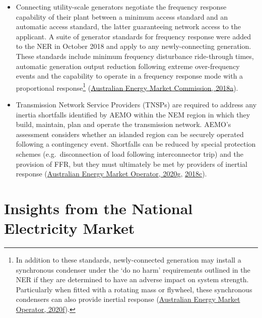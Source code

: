 \documentclass[12pt,a4paper,]{report}
\begin{document}
\begin{itemize}
\item
  Connecting utility-scale generators negotiate the frequency response
  capability of their plant between a minimum access standard and an
  automatic access standard, the latter guaranteeing network access to
  the applicant. A suite of generator standards for frequency response
  were added to the NER in October 2018 and apply to any
  newly-connecting generation. These standards include minimum frequency
  disturbance ride-through times, automatic generation output reduction
  following extreme over-frequency events and the capability to operate
  in a frequency response mode with a proportional response\footnote{In
    addition to these standards, newly-connected generation may install
    a synchronous condenser under the `do no harm' requirements outlined
    in the NER if they are determined to have an adverse impact on
    system strength. Particularly when fitted with a rotating mass or
    flywheel, these synchronous condensers can also provide inertial
    response
    (\protect\hyperlink{ref-australianenergymarketoperatorSystemStrengthNEM2020}{Australian
    Energy Market Operator, 2020f}).}
  (\protect\hyperlink{ref-australianenergymarketcommissionGeneratorTechnicalPerformance2018}{Australian
  Energy Market Commission, 2018a}).
\item
  Transmission Network Service Providers (TNSPs) are required to address
  any inertia shortfalls identified by AEMO within the NEM region in
  which they build, maintain, plan and operate the transmission network.
  AEMO's assessment considers whether an islanded region can be securely
  operated following a contingency event. Shortfalls can be reduced by
  special protection schemes (e.g.~disconnection of load following
  interconnector trip) and the provision of FFR, but they must
  ultimately be met by providers of inertial response
  (\protect\hyperlink{ref-australianenergymarketoperatorNoticeSouthAustralia2020}{Australian
  Energy Market Operator, 2020g},
  \protect\hyperlink{ref-australianenergymarketoperatorInertiaRequirementsMethodology2018}{2018c}).
\end{itemize}

\hypertarget{sec:fcs-insights}{%
\section{Insights from the National Electricity
Market}\label{sec:fcs-insights}}
\end{document}
